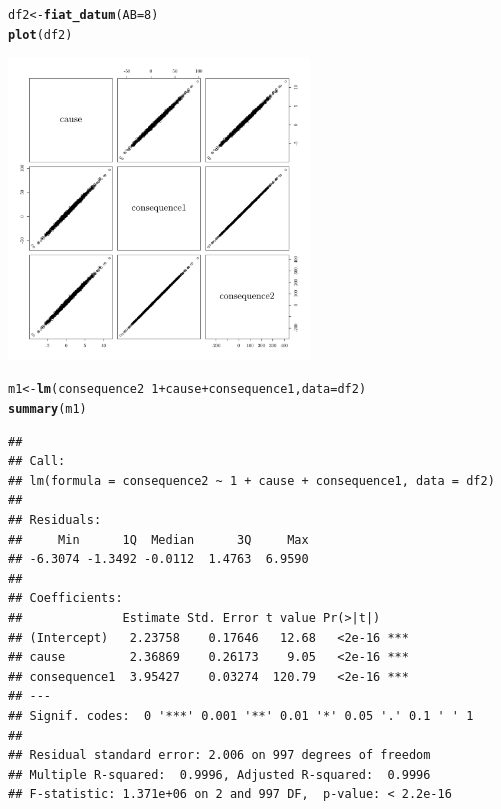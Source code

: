 \documentclass{article}\usepackage[]{graphicx}\usepackage[]{color}
\makeatletter
\newcommand{\hlnum}[1]{\textcolor[rgb]{0.686,0.059,0.569}{#1}}%
\newcommand{\hlopt}[1]{\textcolor[rgb]{0,0,0}{#1}}%
\newcommand{\hlstd}[1]{\textcolor[rgb]{0.345,0.345,0.345}{#1}}%
\newcommand{\hlkwb}[1]{\textcolor[rgb]{0.69,0.353,0.396}{#1}}%
\newcommand{\hlkwc}[1]{\textcolor[rgb]{0.333,0.667,0.333}{#1}}%
\newcommand{\hlkwd}[1]{\textcolor[rgb]{0.737,0.353,0.396}{\textbf{#1}}}%
\newenvironment{kframe}{%
 \def\at@end@of@kframe{}%
 \ifinner\ifhmode%
  \def\at@end@of@kframe{\end{minipage}}%
  \begin{minipage}{\columnwidth}%
 \fi\fi%
 \def\FrameCommand##1{\hskip\@totalleftmargin \hskip-\fboxsep
 \colorbox{shadecolor}{##1}\hskip-\fboxsep
     \hskip-\linewidth \hskip-\@totalleftmargin \hskip\columnwidth}%
 \MakeFramed {\advance\hsize-\width
   \@totalleftmargin\z@ \linewidth\hsize
   \@setminipage}}%
 {\par\unskip\endMakeFramed%
 \at@end@of@kframe}
\newenvironment{knitrout}{}{} %
\makeatother
\begin{document}
\begin{knitrout}
\color{fgcolor}\begin{kframe}
\begin{alltt}
\hlstd{df2}\hlkwb{<-}\hlkwd{fiat_datum}\hlstd{(}\hlkwc{AB}\hlstd{=}\hlnum{8}\hlstd{)}
\hlkwd{plot}\hlstd{(df2)}
\end{alltt}
\end{kframe}

{\centering \includegraphics[width=0.6\textwidth]{figure/dataCor-1} 

}



\end{knitrout}

\begin{knitrout}
\color{fgcolor}\begin{kframe}
\begin{alltt}
\hlstd{m1}\hlkwb{<-}\hlkwd{lm}\hlstd{(consequence2}\hlopt{~}\hlnum{1}\hlopt{+}\hlstd{cause}\hlopt{+}\hlstd{consequence1,}\hlkwc{data}\hlstd{=df2)}
\hlkwd{summary}\hlstd{(m1)}
\end{alltt}
\begin{verbatim}
## 
## Call:
## lm(formula = consequence2 ~ 1 + cause + consequence1, data = df2)
## 
## Residuals:
##     Min      1Q  Median      3Q     Max 
## -6.3074 -1.3492 -0.0112  1.4763  6.9590 
## 
## Coefficients:
##              Estimate Std. Error t value Pr(>|t|)    
## (Intercept)   2.23758    0.17646   12.68   <2e-16 ***
## cause         2.36869    0.26173    9.05   <2e-16 ***
## consequence1  3.95427    0.03274  120.79   <2e-16 ***
## ---
## Signif. codes:  0 '***' 0.001 '**' 0.01 '*' 0.05 '.' 0.1 ' ' 1
## 
## Residual standard error: 2.006 on 997 degrees of freedom
## Multiple R-squared:  0.9996,	Adjusted R-squared:  0.9996 
## F-statistic: 1.371e+06 on 2 and 997 DF,  p-value: < 2.2e-16
\end{verbatim}
\end{kframe}
\end{knitrout}
\end{document}
